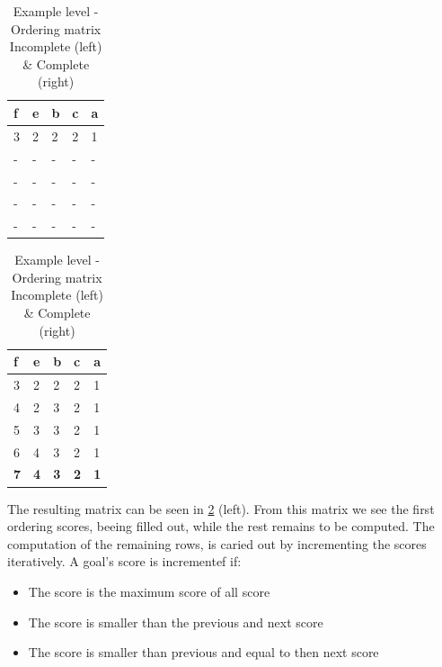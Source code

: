 \begin{table}[h!]
  \caption{\label{tab:example_matrix}\centering Example level - Ordering matrix \break Incomplete (left) \& Complete (right)}
	\begin{minipage}{.5\linewidth}
    \centering
    \begin{tabular}{@{}lllll@{}}
		\toprule
		\textbf{f} & \textbf{e} & \textbf{b} & \textbf{c} & \textbf{a} \\ \midrule
		3          & 2          & 2          & 2          & 1          \\ 
		-          & -          & -          & -          & -          \\ 
		-          & -          & -          & -          & -          \\ 
		-          & -          & -          & -          & -          \\ 
		-          & -          & -          & -          & -          \\ \bottomrule
		\end{tabular}
  \end{minipage}%
  \begin{minipage}{.5\linewidth}
    \centering
    \begin{tabular}{@{}lllll@{}}
		\toprule
		\textbf{f} & \textbf{e} & \textbf{b} & \textbf{c} & \textbf{a} \\ \midrule
		3          & 2          & 2          & 2          & 1          \\ 
		4          & 2          & 3          & 2          & 1          \\ 
		5          & 3          & 3          & 2          & 1          \\ 
		6          & 4          & 3          & 2          & 1          \\ \midrule
		\textbf{7} & \textbf{4} & \textbf{3} & \textbf{2} & \textbf{1} \\ \bottomrule
		\end{tabular}
  \end{minipage} 
\end{table}

The resulting matrix can be seen in \cref{tab:example_matrix} (left). From this matrix we see the first ordering scores, beeing filled out, while the rest remains to be computed. The computation of the remaining rows, is caried out by incrementing the scores iteratively. A goal's score is incrementef if:

\begin{itemize} 
\item{The score is the maximum score of all score}
\item{The score is smaller than the previous and next score }
\item{The score is smaller than previous and equal to then next score}
\end{itemize} 
	
